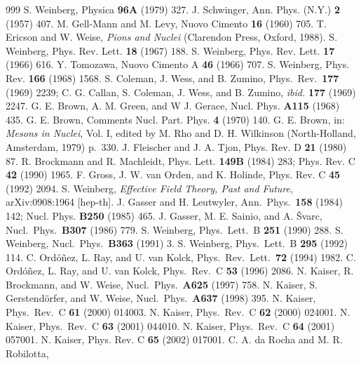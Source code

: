 \documentclass[sort&compress,preprint,3p]{elsarticle}
\begin{document}
\begin{thebibliography}{999}
 S. Weinberg, Physica {\bf 96A} (1979) 327.
 J. Schwinger, Ann. Phys. (N.Y.) {\bf 2} (1957) 407.
 M. Gell-Mann and M. Levy, Nuovo Cimento {\bf 16} (1960) 705.
 T. Ericson and W. Weise, {\it Pions and Nuclei} (Clarendon Press, Oxford, 1988).
 S. Weinberg, Phys. Rev. Lett. {\bf 18} (1967) 188.
 S. Weinberg, Phys. Rev. Lett. {\bf 17} (1966) 616.
Y. Tomozawa, Nuovo Cimento A {\bf 46} (1966) 707.
 S. Weinberg, Phys. Rev. {\bf 166} (1968) 1568.
S. Coleman, J. Wess, and B. Zumino, Phys.\ Rev.\ {\bf 177} (1969) 2239;
C. G. Callan, S. Coleman, J. Wess, and B. Zumino, 
{\it ibid.} {\bf 177} (1969) 2247.
G. E. Brown, A. M. Green, and W J. Gerace, Nucl. Phys. {\bf A115} (1968) 435.
G. E. Brown, Comments Nucl. Part. Phys. {\bf 4} (1970) 140.
G. E. Brown, in: {\it Mesons in Nuclei}, Vol. I, edited by M. Rho and D. H. Wilkinson
(North-Holland, Amsterdam, 1979) p.~330.
J. Fleischer and J. A. Tjon, Phys. Rev. D {\bf 21} (1980) 87.
R. Brockmann and R. Machleidt, Phys. Lett. {\bf 149B} (1984) 283;
Phys. Rev. C {\bf 42} (1990) 1965.
F. Gross, J. W. van Orden, and K. Holinde,
Phys. Rev. C {\bf 45} (1992) 2094.
S. Weinberg, {\it Effective Field Theory, Past and Future},
arXiv:0908:1964 [hep-th].
 J. Gasser and H. Leutwyler,
Ann.\ Phys.\ {\bf 158} (1984) 142; 
Nucl. Phys. {\bf B250} (1985) 465.
 J. Gasser, M. E. Sainio, and A. \v{S}varc,
Nucl.\ Phys.\ {\bf B307} (1986) 779.
 S. Weinberg, Phys.\ Lett.\ B {\bf 251} (1990) 288.
 S. Weinberg, Nucl.\ Phys.\ {\bf B363} (1991) 3.
 S. Weinberg, Phys.\ Lett.\ B {\bf 295} (1992) 114.
C. Ord\'o\~nez, L. Ray, and U. van Kolck,
Phys.\ Rev.\ Lett.\ {\bf 72} (1994) 1982.
C. Ord\'o\~nez, L. Ray, and U. van Kolck,
Phys.\ Rev.\ C {\bf 53} (1996) 2086.
 N. Kaiser, R. Brockmann, and W. Weise,
Nucl.\ Phys.\ {\bf A625} (1997) 758.
 N. Kaiser, S. Gerstend\"orfer, and W. Weise,
Nucl.\ Phys.\ {\bf A637} (1998) 395.
 N. Kaiser, Phys.\ Rev.\ C {\bf 61} (2000) 014003.
 N. Kaiser, Phys.\ Rev.\ C {\bf 62} (2000) 024001.
 N. Kaiser, Phys.\ Rev.\ C {\bf 63} (2001) 044010.
 N. Kaiser, Phys.\ Rev.\ C {\bf 64} (2001) 057001.
 N. Kaiser, Phys. Rev. C {\bf 65} (2002) 017001.
C. A. da Rocha and M. R. Robilotta, 

\end{thebibliography}
\end{document}
